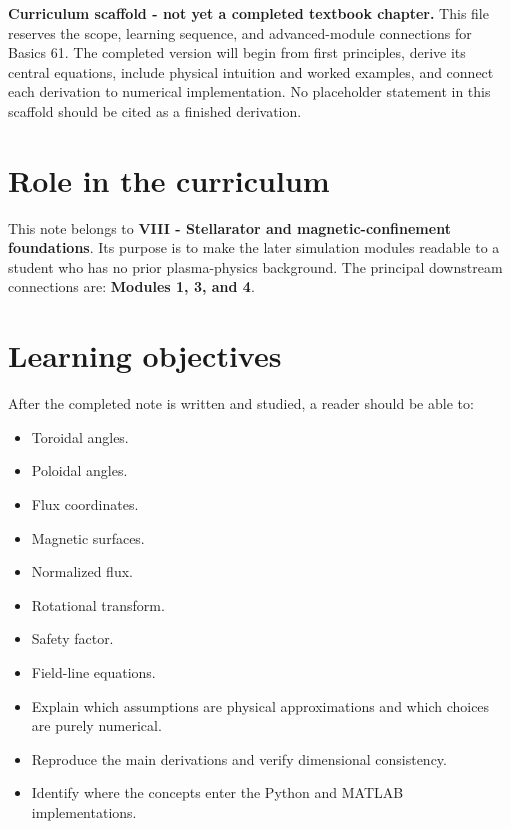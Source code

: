\documentclass[11pt]{article}
\begin{document}

\begin{overviewbox}
\textbf{Curriculum scaffold - not yet a completed textbook chapter.} This file reserves the scope, learning sequence, and advanced-module connections for Basics 61. The completed version will begin from first principles, derive its central equations, include physical intuition and worked examples, and connect each derivation to numerical implementation. No placeholder statement in this scaffold should be cited as a finished derivation.
\end{overviewbox}

\ProjectTOC

\section{Role in the curriculum}
This note belongs to \textbf{VIII - Stellarator and magnetic-confinement foundations}. Its purpose is to make the later simulation modules readable to a student who has no prior plasma-physics background. The principal downstream connections are: \textbf{Modules 1, 3, and 4}.

\section{Learning objectives}
After the completed note is written and studied, a reader should be able to:
\begin{itemize}[leftmargin=1.6em]
\item Toroidal angles.
\item Poloidal angles.
\item Flux coordinates.
\item Magnetic surfaces.
\item Normalized flux.
\item Rotational transform.
\item Safety factor.
\item Field-line equations.
\item Explain which assumptions are physical approximations and which choices are purely numerical.
\item Reproduce the main derivations and verify dimensional consistency.
\item Identify where the concepts enter the Python and MATLAB implementations.
\end{itemize}
\end{document}

